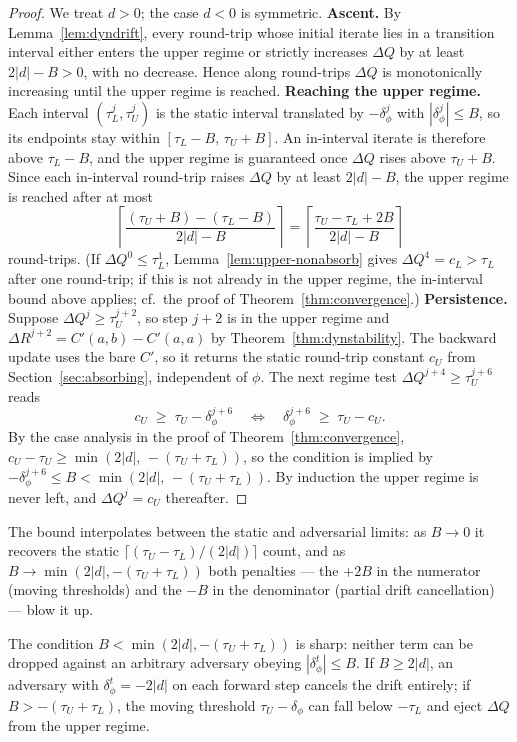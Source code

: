\begin{proof}
We treat $d>0$; the case $d<0$ is symmetric.
\textbf{Ascent.}  By Lemma~\ref{lem:dyndrift}, every round-trip whose initial iterate lies in a transition interval either enters the upper regime or strictly increases $\Delta Q$ by at least $2|d|-B>0$, with no decrease.  Hence along round-trips $\Delta Q$ is monotonically increasing until the upper regime is reached.
\textbf{Reaching the upper regime.}  Each interval $(\tau_L^j,\tau_U^j)$ is the static interval translated by $-\delta^j_\phi$ with $|\delta^j_\phi|\leq B$, so its endpoints stay within $[\tau_L-B,\,\tau_U+B]$.  An in-interval iterate is therefore above $\tau_L-B$, and the upper regime is guaranteed once $\Delta Q$ rises above $\tau_U+B$.  Since each in-interval round-trip raises $\Delta Q$ by at least $2|d|-B$, the upper regime is reached after at most
\[
    \left\lceil \frac{(\tau_U+B)-(\tau_L-B)}{2|d|-B} \right\rceil
    = \left\lceil \frac{\tau_U-\tau_L+2B}{2|d|-B} \right\rceil
\]
round-trips.  (If $\Delta Q^0 \leq \tau_L^1$, Lemma~\ref{lem:upper-nonabsorb} gives $\Delta Q^4 = c_L > \tau_L$ after one round-trip; if this is not already in the upper regime, the in-interval bound above applies; cf.\ the proof of Theorem~\ref{thm:convergence}.)
\textbf{Persistence.}  Suppose $\Delta Q^j \geq \tau_U^{j+2}$, so step $j+2$ is in the upper regime and $\Delta R^{j+2} = C'(a,b)-C'(a,a)$ by Theorem~\ref{thm:dynstability}.  The backward update uses the bare $C'$, so it returns the static round-trip constant $c_U$ from Section~\ref{sec:absorbing}, independent of $\phi$.  The next regime test $\Delta Q^{j+4} \geq \tau_U^{j+6}$ reads
\[
    c_U \;\geq\; \tau_U - \delta^{j+6}_\phi
    \quad\Longleftrightarrow\quad
    \delta^{j+6}_\phi \;\geq\; \tau_U - c_U .
\]
By the case analysis in the proof of Theorem~\ref{thm:convergence}, $c_U - \tau_U \geq \min(2|d|,\,-(\tau_U+\tau_L))$, so the condition is implied by $-\delta^{j+6}_\phi \leq B < \min(2|d|,\,-(\tau_U+\tau_L))$.  By induction the upper regime is never left, and $\Delta Q^j = c_U$ thereafter. \qedhere
\end{proof}
The bound interpolates between the static and adversarial limits: as $B \to 0$ it recovers the static $\lceil(\tau_U - \tau_L)/(2|d|)\rceil$ count, and as $B \to \min(2|d|, -(\tau_U+\tau_L))$ both penalties --- the $+2B$ in the numerator (moving thresholds) and the $-B$ in the denominator (partial drift cancellation) --- blow it up.
\begin{remark}\label{rem:tight}
The condition $B < \min(2|d|,-(\tau_U+\tau_L))$ is sharp: neither term can be dropped against an arbitrary adversary obeying $|\delta^t_\phi| \leq B$.  If $B \geq 2|d|$, an adversary with $\delta^t_\phi = -2|d|$ on each forward step cancels the drift entirely; if $B > -(\tau_U+\tau_L)$, the moving threshold $\tau_U - \delta_\phi$ can fall below $-\tau_L$ and eject $\Delta Q$ from the upper regime.
\end{remark}
